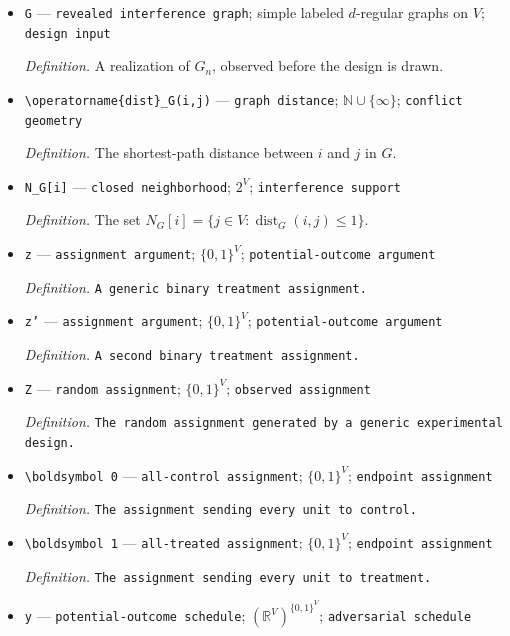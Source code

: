\documentclass{article}
\begin{document}
\begin{itemize}
  \item \texttt{G} --- \texttt{revealed interference graph}; simple labeled \(d\)-regular graphs on \(V\); \texttt{design input}
  \par\smallskip\noindent\emph{Definition.} A realization of \(G_n\), observed before the design is drawn.
  \item \texttt{\textbackslash{}\allowbreak{}operatorname\{dist\}\allowbreak{}\_\allowbreak{}G(i,\allowbreak{}j)} --- \texttt{graph distance}; \(\mathbb N\cup\{\infty\}\); \texttt{conflict geometry}
  \par\smallskip\noindent\emph{Definition.} The shortest-path distance between \(i\) and \(j\) in \(G\).
  \item \texttt{N\_\allowbreak{}G[i]} --- \texttt{closed neighborhood}; \(2^V\); \texttt{interference support}
  \par\smallskip\noindent\emph{Definition.} The set \(N_G[i]=\{j\in V:\operatorname{dist}_G(i,j)\le 1\}\).
  \item \texttt{z} --- \texttt{assignment argument}; \(\{0,1\}^V\); \texttt{potential-\allowbreak{}outcome argument}
  \par\smallskip\noindent\emph{Definition.} \texttt{A generic binary treatment assignment.}
  \item \texttt{z'} --- \texttt{assignment argument}; \(\{0,1\}^V\); \texttt{potential-\allowbreak{}outcome argument}
  \par\smallskip\noindent\emph{Definition.} \texttt{A second binary treatment assignment.}
  \item \texttt{Z} --- \texttt{random assignment}; \(\{0,1\}^V\); \texttt{observed assignment}
  \par\smallskip\noindent\emph{Definition.} \texttt{The random assignment generated by a generic experimental design.}
  \item \texttt{\textbackslash{}\allowbreak{}boldsymbol 0} --- \texttt{all-\allowbreak{}control assignment}; \(\{0,1\}^V\); \texttt{endpoint assignment}
  \par\smallskip\noindent\emph{Definition.} \texttt{The assignment sending every unit to control.}
  \item \texttt{\textbackslash{}\allowbreak{}boldsymbol 1} --- \texttt{all-\allowbreak{}treated assignment}; \(\{0,1\}^V\); \texttt{endpoint assignment}
  \par\smallskip\noindent\emph{Definition.} \texttt{The assignment sending every unit to treatment.}
  \item \texttt{y} --- \texttt{potential-\allowbreak{}outcome schedule}; \((\mathbb R^V)^{\{0,1\}^V}\); \texttt{adversarial schedule}

\end{itemize}
\end{document}
